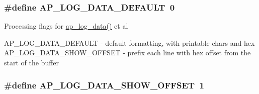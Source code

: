 \subsubsection[{\texorpdfstring{A\+P\+\_\+\+L\+O\+G\+\_\+\+D\+A\+T\+A\+\_\+\+D\+E\+F\+A\+U\+LT}{AP_LOG_DATA_DEFAULT}}]{\setlength{\rightskip}{0pt plus 5cm}\#define A\+P\+\_\+\+L\+O\+G\+\_\+\+D\+A\+T\+A\+\_\+\+D\+E\+F\+A\+U\+LT~0}\hypertarget{group__APACHE__CORE__LOG_ga2bd7f0232a37435953971a8bb8a4d6ca}{}\label{group__APACHE__CORE__LOG_ga2bd7f0232a37435953971a8bb8a4d6ca}
Processing flags for \hyperlink{group__APACHE__CORE__LOG_ga8ead657a9fca1b916e489340dd774b43}{ap\+\_\+log\+\_\+data()} et al

A\+P\+\_\+\+L\+O\+G\+\_\+\+D\+A\+T\+A\+\_\+\+D\+E\+F\+A\+U\+LT -\/ default formatting, with printable chars and hex A\+P\+\_\+\+L\+O\+G\+\_\+\+D\+A\+T\+A\+\_\+\+S\+H\+O\+W\+\_\+\+O\+F\+F\+S\+ET -\/ prefix each line with hex offset from the start of the buffer 
\subsubsection[{\texorpdfstring{A\+P\+\_\+\+L\+O\+G\+\_\+\+D\+A\+T\+A\+\_\+\+S\+H\+O\+W\+\_\+\+O\+F\+F\+S\+ET}{AP_LOG_DATA_SHOW_OFFSET}}]{\setlength{\rightskip}{0pt plus 5cm}\#define A\+P\+\_\+\+L\+O\+G\+\_\+\+D\+A\+T\+A\+\_\+\+S\+H\+O\+W\+\_\+\+O\+F\+F\+S\+ET~1}\hypertarget{group__APACHE__CORE__LOG_ga177b79de2a0997a6de01fd94e7be1343}{}\label{group__APACHE__CORE__LOG_ga177b79de2a0997a6de01fd94e7be1343}
